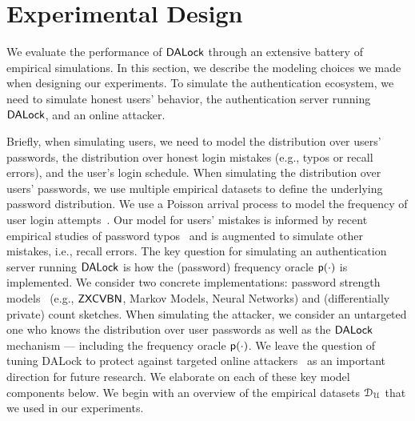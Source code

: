 \vspace*{-\baselineskip}
\vspace*{-\baselineskip}
\section{Experimental Design} %
\vspace*{-\baselineskip}
We evaluate the performance of $\mathsf{DALock}$ through an extensive battery of empirical simulations. In this section, we describe the modeling choices we made when designing our experiments. To simulate the authentication ecosystem, we need to simulate honest users' behavior, the authentication server running $\mathsf{DALock}$, and an online attacker. 

Briefly, when simulating users, we need to model the distribution over users’ passwords, the distribution over honest login mistakes (e.g., typos or recall errors), and the user's login schedule. When simulating the distribution over users’ passwords, we use multiple empirical datasets to define the underlying password distribution. We use a Poisson arrival process to model the frequency of user login attempts~\cite{AC:BloBluDat13}. Our model for users’ mistakes is informed by recent empirical studies of password typos~\cite{CCS:CWPCR17,SP:CAAJR16} and is augmented to simulate other mistakes, i.e., recall errors.  The key question for simulating an authentication server running $\mathsf{DALock}$ is how the (password) frequency oracle $\textsf{p}(\cdot)$ is implemented. We consider two concrete implementations: password strength models~\cite{ USENIX:Wheeler16,USENIX:USBCCKKMMS15,USENIX:MUSKBCC16} (e.g., $\mathsf{ZXCVBN}$, Markov Models, Neural Networks) and (differentially private) count sketches. When simulating the attacker, we consider an untargeted one who knows the distribution over user passwords as well as the $\mathsf{DALock}$ mechanism --- including the frequency oracle $\textsf{p}(\cdot)$. We leave the question of tuning DALock to protect against targeted online attackers~\cite{CCS:WZWYH16} as an important direction for future research. We elaborate on each of these key model components below.  We begin with an overview of the empirical datasets $\mathcal{D}_{{\mathcal{U}}}$ that we used in our experiments.

\vspace*{-\baselineskip}
\vspace*{-\baselineskip}
